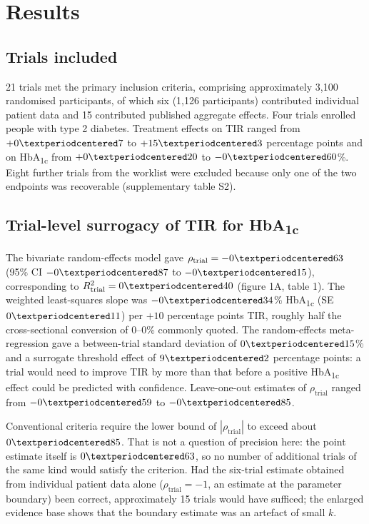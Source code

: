 \documentclass[11pt,a4paper]{article}
\newcommand{\pp}{percentage points}
\begin{document}
\section{Results}

\subsection{Trials included}
21 trials met the primary inclusion criteria, comprising approximately 3,100 randomised participants, of
which six (1,126 participants) contributed individual patient data and 15 contributed published aggregate
effects. Four trials enrolled people with type 2 diabetes. Treatment effects on TIR ranged from
$+0\textperiodcentered7$ to $+15\textperiodcentered3$ \pp{} and on HbA\textsubscript{1c} from
$+0\textperiodcentered20$ to $-0\textperiodcentered60$\%. Eight further trials from the worklist were
excluded because only one of the two endpoints was recoverable (supplementary table S2).

\subsection{Trial-level surrogacy of TIR for HbA\textsubscript{1c}}
The bivariate random-effects model gave $\rho_{\mathrm{trial}} = -0\textperiodcentered63$ (95\% CI
$-0\textperiodcentered87$ to $-0\textperiodcentered15$), corresponding to
$R^2_{\mathrm{trial}} = 0\textperiodcentered40$ (figure 1A, table 1). The weighted least-squares slope was
$-0\textperiodcentered34$\% HbA\textsubscript{1c} (SE $0\textperiodcentered11$) per $+10$ \pp{} TIR, roughly
half the cross-sectional conversion of 0--0\% commonly
quoted.\citep{beck2019tir,bergenstal2018} The
random-effects meta-regression gave a between-trial standard deviation of $0\textperiodcentered15$\% and a
surrogate threshold effect of $9\textperiodcentered2$ \pp: a trial would need to improve TIR by more than
that before a positive HbA\textsubscript{1c} effect could be predicted with confidence. Leave-one-out
estimates of $\rho_{\mathrm{trial}}$ ranged from $-0\textperiodcentered59$ to $-0\textperiodcentered85$.

Conventional criteria require the lower bound of $|\rho_{\mathrm{trial}}|$ to exceed about
$0\textperiodcentered85$. That is not a question of precision here: the point estimate itself is
$0\textperiodcentered63$, so no number of additional trials of the same kind would satisfy the criterion.
Had the six-trial estimate obtained from individual patient data alone ($\rho_{\mathrm{trial}} = -1$, an
estimate at the parameter boundary) been correct, approximately 15 trials would have sufficed; the enlarged
evidence base shows that the boundary estimate was an artefact of small $k$.
\end{document}
